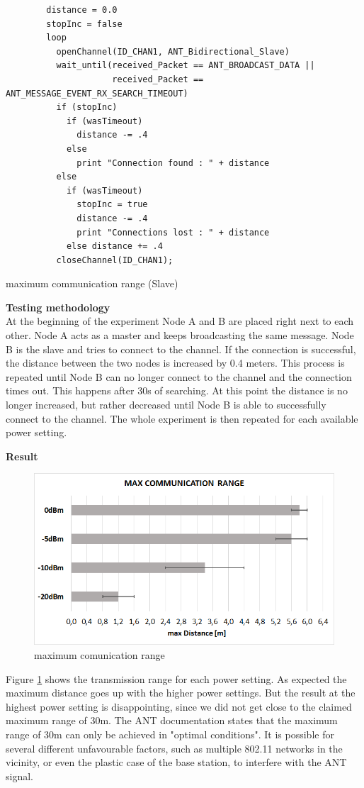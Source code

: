 \begin{description}
	\begin{code}[H]
		\begin{verbatim}
		distance = 0.0
		stopInc = false
		loop 
		  openChannel(ID_CHAN1, ANT_Bidirectional_Slave)
		  wait_until(received_Packet == ANT_BROADCAST_DATA || 
		             received_Packet == ANT_MESSAGE_EVENT_RX_SEARCH_TIMEOUT) 
		  if (stopInc) 
		    if (wasTimeout) 
		      distance -= .4
		    else 
		      print "Connection found : " + distance
		  else
		    if (wasTimeout)  
		      stopInc = true
		      distance -= .4
		      print "Connections lost : " + distance
		    else distance += .4
		  closeChannel(ID_CHAN1);
		\end{verbatim}
		\caption{maximum communication range (Slave)}\label{lst:sExp6}
	\end{code}
	\item{\textbf{Testing methodology}} \hfill \\ At the beginning of the experiment Node A and B are placed right next to each other. Node A acts as a master and keeps broadcasting the same message. Node B is the slave and tries to connect to the channel. If the connection is successful, the distance between the two nodes is increased by 0.4 meters. This process is repeated until Node B can no longer connect to the channel and the connection times out. This happens after 30s of searching. At this point the distance is no longer increased, but rather decreased until Node B is able to successfully connect to the channel. The whole experiment is then repeated for each available power setting.	
	\item{\textbf{Result}} \hfill \\ 
	\begin{figure}[H]
		\centering
		\includegraphics[scale=0.5]{content/images/exp6.png}
		\caption{maximum comunication range}\label{fig:exp6}
	\end{figure}
	Figure \ref{fig:exp6} shows the transmission range for each power setting. As expected the maximum distance goes up with the higher power settings. But the result at the highest power setting is disappointing, since we did not get close to the claimed maximum range of 30m. The ANT documentation states that the maximum range of 30m can only be achieved in "optimal conditions"\cite{DynastreamInnovationsInc.2013}. It is possible for several different unfavourable factors, such as multiple 802.11 networks in the vicinity, or even the plastic case of the base station, to interfere with the ANT signal. 
\end{description}


